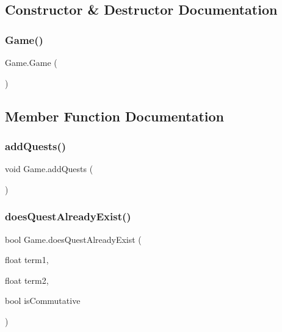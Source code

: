 \subsection{Constructor \& Destructor Documentation}
\mbox{\label{classGame_a2e034e53e9c032964ecd2a831b29a616}} 
\subsubsection{\texorpdfstring{Game()}{Game()}}
{\footnotesize\ttfamily Game.\+Game (\begin{DoxyParamCaption}{ }\end{DoxyParamCaption})\hspace{0.3cm}{\ttfamily [inline]}}



\subsection{Member Function Documentation}
\mbox{\label{classGame_ab082e0ceed285697693c3750e203d597}} 
\subsubsection{\texorpdfstring{add\+Quests()}{addQuests()}}
{\footnotesize\ttfamily void Game.\+add\+Quests (\begin{DoxyParamCaption}{ }\end{DoxyParamCaption})\hspace{0.3cm}{\ttfamily [inline]}}

\mbox{\label{classGame_a0040f1dc86b0628a17286895b1738a10}} 
\subsubsection{\texorpdfstring{does\+Quest\+Already\+Exist()}{doesQuestAlreadyExist()}}
{\footnotesize\ttfamily bool Game.\+does\+Quest\+Already\+Exist (\begin{DoxyParamCaption}\item[{float}]{term1,  }\item[{float}]{term2,  }\item[{bool}]{is\+Commutative }\end{DoxyParamCaption})\hspace{0.3cm}{\ttfamily [inline]}}


